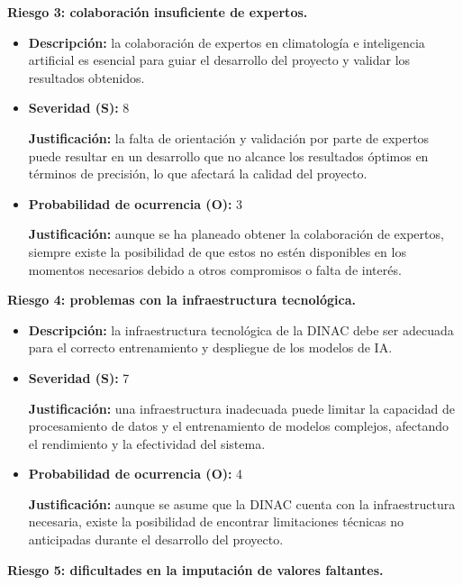 \documentclass[
11pt, %
codirector, %
]{charter}
\begin{document}
\textbf{Riesgo 3: colaboración insuficiente de expertos.}

\begin{itemize}
  \item \textbf{Descripción:} la colaboración de expertos en climatología e inteligencia artificial es esencial para guiar el desarrollo del proyecto y validar los resultados obtenidos.
  \item \textbf{Severidad (S):} 8
  
  \textbf{Justificación:} la falta de orientación y validación por parte de expertos puede resultar en un desarrollo que no alcance los resultados óptimos en términos de precisión, lo que afectará la calidad del proyecto.
  \item \textbf{Probabilidad de ocurrencia (O):} 3
  
  \textbf{Justificación:} aunque se ha planeado obtener la colaboración de expertos, siempre existe la posibilidad de que estos no estén disponibles en los momentos necesarios debido a otros compromisos o falta de interés.
\end{itemize}

\textbf{Riesgo 4: problemas con la infraestructura tecnológica.}

\begin{itemize}
  \item \textbf{Descripción:} la infraestructura tecnológica de la DINAC debe ser adecuada para el correcto entrenamiento y despliegue de los modelos de IA.
  \item \textbf{Severidad (S):} 7
  
  \textbf{Justificación:} una infraestructura inadecuada puede limitar la capacidad de procesamiento de datos y el entrenamiento de modelos complejos, afectando el rendimiento y la efectividad del sistema.
  \item \textbf{Probabilidad de ocurrencia (O):} 4
  
  \textbf{Justificación:} aunque se asume que la DINAC cuenta con la infraestructura necesaria, existe la posibilidad de encontrar limitaciones técnicas no anticipadas durante el desarrollo del proyecto.
\end{itemize}

\textbf{Riesgo 5: dificultades en la imputación de valores faltantes.}
\end{document}
